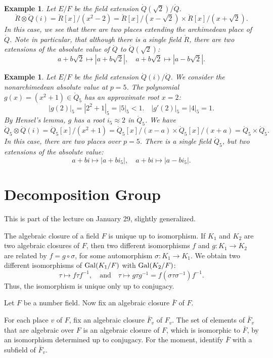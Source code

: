 \documentclass{amsart}
\newtheorem{example}[exercise]{Example}
\def\abs#1{{|#1|}}
\begin{document}
\begin{example} Let $E/F$ be the field extension $\ring{Q}(\sqrt{2})/\ring{Q}$.
\[
\ring{R}\otimes \ring{Q}(i) = \ring{R}[x]/(x^2 - 2) = 
\ring{R}[x]/(x - \sqrt{2}) \times
\ring{R}[x]/(x + \sqrt{2}).
\]
In this case, we see that there are two places extending the archimedean
place of $\ring{Q}$.  Note in particular, that although there is a single field
$\ring{R}$, there are two extensions of the absolute value of $\ring{Q}$ to
$\ring{Q}(\sqrt{2})$:
\[
a+ b\sqrt{2}\mapsto \abs{a + b \sqrt{2}},\quad a + b\sqrt{2}\mapsto \abs{a-b\sqrt{2}}.
\]
\end{example}

\begin{example} Let $E/F$ be the field extension $\ring{Q}(i)/\ring{Q}$.
We consider the nonarchimedean absolute value at $p=5$.
The polynomial $g(x)=(x^2+1)\in\ring{Q}_5$ has an approximate root $x=2$:
\[
\abs{g(2)}_5=\abs{2^2 + 1}_5=\abs{5}_5 < 1.\quad \abs{g'(2)}_5 = \abs{4}_5=1.
\]
By Hensel's lemma, $g$ has a root $i_5\approx 2$ in $\ring{Q}_5$. We have
\[
\ring{Q}_5\otimes \ring{Q}(i) = \ring{Q}_5[x]/(x^2+1) = 
\ring{Q}_5[x]/(x - a)\times
\ring{Q}_5[x]/(x+a) = \ring{Q}_5\times\ring{Q}_5.
\]
In this case, there are two places over $p=5$.  There is a single field
$\ring{Q}_5$, but two extensions of the absolute value:
\[
a + b i \mapsto \abs{a + b i_5},\quad
a + b i \mapsto \abs{a - b i_5}.
\]
\end{example}



\newpage
\section{Decomposition Group}

This is part of the lecture on January 29, slightly generalized.

The algebraic closure of a field $F$ is unique up to isomorphism.
If $K_1$ and $K_2$ are two algebraic closures of $F$, then two different
isomorphisms $f$ and $g:K_1\to K_2$ are related by $f = g \circ \sigma$, for some 
automorphism $\sigma: K_1\to K_1$.  We obtain two different isomorphisms
of ${\operatorname{Gal}}(K_1/F)$ with ${\operatorname{Gal}}(K_2/F)$:
\[
\tau \mapsto f \tau f^{-1},\quad \text{and}\quad 
\tau\mapsto g\tau g^{-1} = f (\sigma\tau\sigma^{-1}) f^{-1}.
\]
Thus, the isomorphism is unique only up to conjugacy.  

Let $F$ be a number field.
Now fix an algebraic closure $\bar{F}$ of $F$.

For each place  $v$ of $F$, fix an algebraic closure $\bar{F}_v$ of
$F_v$.  The set of elements of $\bar{F}_v$ that are
algebraic over $F$ is an algebraic closure of $F$, which
is isomorphic to $\bar{F}$, by an isomorphism determined up to
conjugacy.  For the moment, identify $\bar{F}$ with a subfield
of $\bar{F}_v$.
\end{document}
